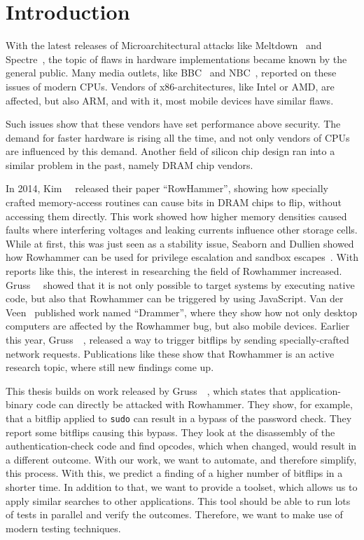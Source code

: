 \chapter{Introduction}\label{sec:intro}

With the latest releases of Microarchitectural attacks like
Meltdown~\cite{meltdown} and Spectre~\cite{spectre}, the topic of flaws in
hardware implementations became known by the general public. Many media outlets,
like BBC~\cite{bbcmeltdown} and NBC~\cite{nbcmeltdown}, reported on these issues
of modern CPUs. Vendors of x86-architectures, like Intel or AMD, are affected,
but also ARM, and with it, most mobile devices have similar flaws.

Such issues show that these vendors have set performance above security. The
demand for faster hardware is rising all the time, and not only vendors of CPUs
are influenced by this demand. Another field of silicon chip design ran into a
similar problem in the past, namely DRAM chip vendors.

In 2014, Kim~\etal~\cite{rowhammergeneral} released their paper ``RowHammer'',
showing how specially crafted memory-access routines can cause bits in DRAM
chips to flip, without accessing them directly. This work showed how higher
memory densities caused faults where interfering voltages and leaking currents
influence other storage cells. While at first, this was just seen as a stability
issue, Seaborn and Dullien showed how Rowhammer can be used for privilege
escalation and sandbox escapes~\cite{projectzerorow}. With reports like this,
the interest in researching the field of Rowhammer increased.
Gruss~\etal~\cite{rowhammerjs} showed that it is not only possible to target
systems by executing native code, but also that Rowhammer can be triggered by
using JavaScript. Van der Veen~\etal\cite{drammer} published work named
``Drammer'', where they show how not only desktop computers are affected by the
Rowhammer bug, but also mobile devices. Earlier this year,
Gruss~\etal~\cite{nethammer}, released a way to trigger bitflips by sending
specially-crafted network requests. Publications like these show that Rowhammer
is an active research topic, where still new findings come up.

This thesis builds on work released by Gruss~\etal~\cite{flipinthewall}, which
states that application-binary code can directly be attacked with Rowhammer.
They show, for example, that a bitflip applied to \texttt{sudo} can result in a
bypass of the password check. They report some bitflips causing this bypass.
They look at the disassembly of the authentication-check code and find opcodes,
which when changed, would result in a different outcome. With our work, we want
to automate, and therefore simplify, this process. With this, we predict a
finding of a higher number of bitflips in a shorter time. In addition to that,
we want to provide a toolset, which allows us to apply similar searches to other
applications. This tool should be able to run lots of tests in parallel and
verify the outcomes. Therefore, we want to make use of modern testing
techniques.

